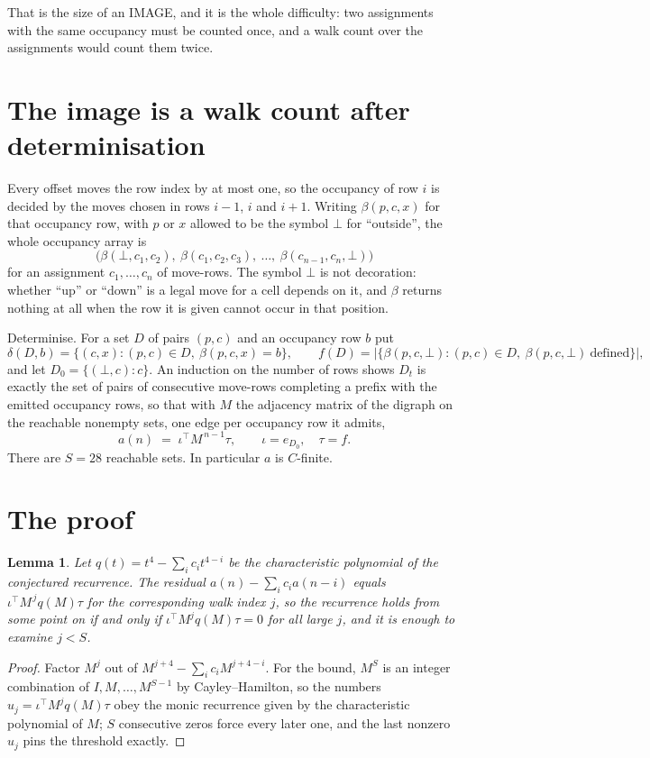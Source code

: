 \documentclass[11pt,a4paper]{article}
\theoremstyle{plain}
\newtheorem{lemma}[theorem]{Lemma}
\theoremstyle{definition}
\begin{document}
That is the size of an IMAGE, and it is the whole difficulty: two assignments with the same
occupancy must be counted once, and a walk count over the assignments would count them twice.

\section{The image is a walk count after determinisation}

Every offset moves the row index by at most one, so the occupancy of row $i$ is decided by the
moves chosen in rows $i-1$, $i$ and $i+1$. Writing $\beta(p,c,x)$ for that occupancy row, with
$p$ or $x$ allowed to be the symbol $\bot$ for ``outside'', the whole occupancy array is
\[
\bigl(\beta(\bot,c_1,c_2),\ \beta(c_1,c_2,c_3),\ \dots,\ \beta(c_{n-1},c_n,\bot)\bigr)
\]
for an assignment $c_1,\dots,c_n$ of move-rows. The symbol $\bot$ is not decoration: whether
``up'' or ``down'' is a legal move for a cell depends on it, and $\beta$ returns nothing at all
when the row it is given cannot occur in that position.

Determinise. For a set $D$ of pairs $(p,c)$ and an occupancy row $b$ put
\[
\delta(D,b)=\{(c,x):(p,c)\in D,\ \beta(p,c,x)=b\},\qquad
f(D)=\bigl|\{\beta(p,c,\bot):(p,c)\in D,\ \beta(p,c,\bot)\ \text{defined}\}\bigr| ,
\]
and let $D_0=\{(\bot,c):c\}$. An induction on the number of rows shows $D_t$ is exactly the
set of pairs of consecutive move-rows completing a prefix with the emitted occupancy rows, so
that with $M$ the adjacency matrix of the digraph on the reachable nonempty sets, one edge per
occupancy row it admits,
\[
a(n)\;=\;\iota^{\!\top}M^{\,n-1}\tau,\qquad \iota=e_{D_0},\quad \tau=f .
\]
There are $S=28$ reachable sets. In particular $a$ is $C$-finite.

\section{The proof}

\begin{lemma}\label{lem:crit}
Let $q(t)=t^{4}-\sum_i c_it^{4-i}$ be the characteristic polynomial of the
conjectured recurrence. The residual $a(n)-\sum_ic_ia(n-i)$ equals
$\iota^{\!\top}M^{\,j}q(M)\tau$ for the corresponding walk index $j$, so the recurrence
holds from some point on if and only if $\iota^{\!\top}M^{j}q(M)\tau=0$ for all large $j$,
and it is enough to examine $j<S$.
\end{lemma}

\begin{proof}
Factor $M^{j}$ out of $M^{j+4}-\sum_ic_iM^{j+4-i}$. For the bound, $M^{S}$
is an integer combination of $I,M,\dots,M^{S-1}$ by Cayley--Hamilton, so the numbers
$u_j=\iota^{\!\top}M^{j}q(M)\tau$ obey the monic recurrence given by the characteristic
polynomial of $M$; $S$ consecutive zeros force every later one, and the last nonzero $u_j$
pins the threshold exactly.
\end{proof}
\end{document}
